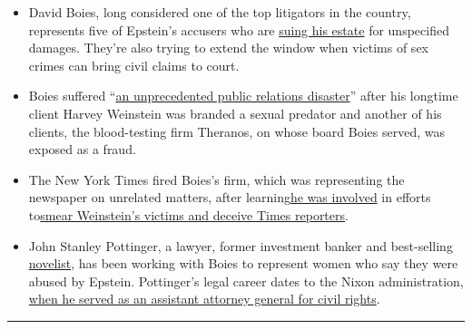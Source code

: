 \begin{itemize}
\tightlist
\item
  David Boies, long considered one of the top litigators in the country,
  represents five of Epstein's accusers who are
  \href{https://www.nytimes3xbfgragh.onion/2019/11/17/nyregion/jeffrey-epstein-lawsuits-victims.html}{suing
  his estate} for unspecified damages. They're also trying to extend the
  window when victims of sex crimes can bring civil claims to court.
\end{itemize}

\begin{itemize}
\tightlist
\item
  Boies suffered
  ``\href{https://www.nytimes3xbfgragh.onion/2018/09/21/business/david-boies-pleads-not-guilty.html}{an
  unprecedented public relations disaster}'' after his longtime client
  Harvey Weinstein was branded a sexual predator and another of his
  clients, the blood-testing firm Theranos, on whose board Boies served,
  was exposed as a fraud.
\end{itemize}

\begin{itemize}
\tightlist
\item
  The New York Times fired Boies's firm, which was representing the
  newspaper on unrelated matters, after
  learning\href{https://www.nytimes3xbfgragh.onion/2017/11/07/business/weinstein-lawyer-david-boies.html}{he
  was involved} in efforts
  to\href{https://www.nytimes3xbfgragh.onion/2017/11/07/us/harvey-weinstein-new-yorker.html}{smear
  Weinstein's victims and deceive Times reporters}.
\end{itemize}

\begin{itemize}
\tightlist
\item
  John Stanley Pottinger, a lawyer, former investment banker and
  best-selling
  \href{https://www.nytimes3xbfgragh.onion/1995/04/09/books/one-damn-thing-after-three-anothers.html}{novelist},
  has been working with Boies to represent women who say they were
  abused by Epstein. Pottinger's legal career dates to the Nixon
  administration,
  \href{https://www.nytimes3xbfgragh.onion/1974/03/30/archives/civil-rights-protector-john-stanley-pottinger-an-early-job.html}{when
  he served as an assistant attorney general for civil rights}.
\end{itemize}

\begin{center}\rule{0.5\linewidth}{\linethickness}\end{center}


